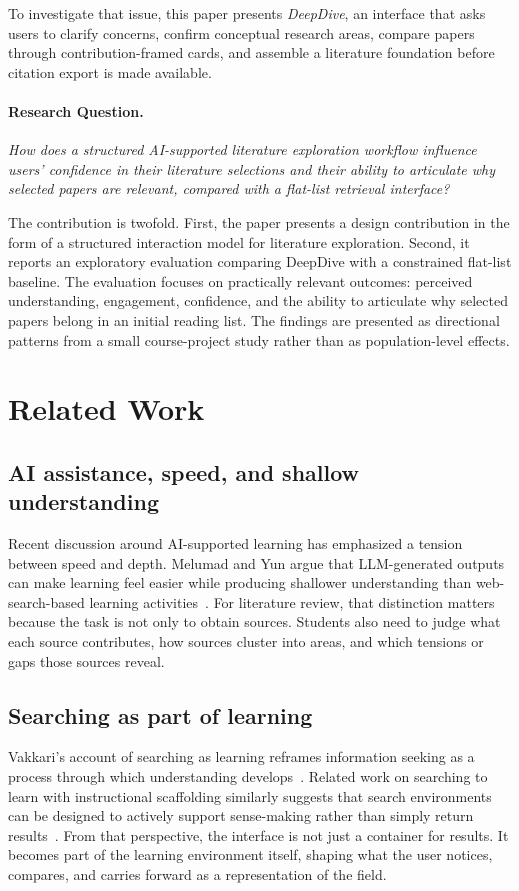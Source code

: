 \documentclass[manuscript,screen]{acmart}
\begin{document}
To investigate that issue, this paper presents \textit{DeepDive}, an interface that asks users to clarify concerns, confirm conceptual research areas, compare papers through contribution-framed cards, and assemble a literature foundation before citation export is made available.

\paragraph{Research Question.} \textit{How does a structured AI-supported literature exploration workflow influence users' confidence in their literature selections and their ability to articulate why selected papers are relevant, compared with a flat-list retrieval interface?}

The contribution is twofold. First, the paper presents a design contribution in the form of a structured interaction model for literature exploration. Second, it reports an exploratory evaluation comparing DeepDive with a constrained flat-list baseline. The evaluation focuses on practically relevant outcomes: perceived understanding, engagement, confidence, and the ability to articulate why selected papers belong in an initial reading list. The findings are presented as directional patterns from a small course-project study rather than as population-level effects.

\section{Related Work}
\subsection{AI assistance, speed, and shallow understanding}
Recent discussion around AI-supported learning has emphasized a tension between speed and depth. Melumad and Yun argue that LLM-generated outputs can make learning feel easier while producing shallower understanding than web-search-based learning activities~\cite{melumad2025llmlearning}. For literature review, that distinction matters because the task is not only to obtain sources. Students also need to judge what each source contributes, how sources cluster into areas, and which tensions or gaps those sources reveal.

\subsection{Searching as part of learning}
Vakkari's account of searching as learning reframes information seeking as a process through which understanding develops~\cite{vakkari2016searching}. Related work on searching to learn with instructional scaffolding similarly suggests that search environments can be designed to actively support sense-making rather than simply return results~\cite{camara2021searching}. From that perspective, the interface is not just a container for results. It becomes part of the learning environment itself, shaping what the user notices, compares, and carries forward as a representation of the field.
\end{document}
